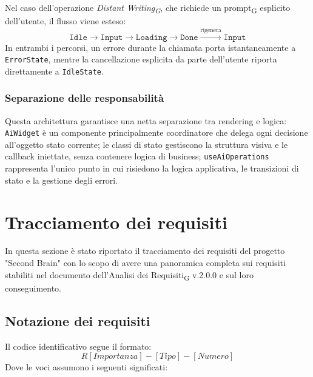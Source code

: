 \documentclass[11pt,a4paper]{article}
\newcommand{\gls}[1]{#1\textsubscript{G}}
\begin{document}
Nel caso dell'operazione \textit{\gls{Distant Writing}}, che richiede un \gls{prompt} esplicito dell'utente, il flusso viene esteso:
\begin{equation*}
\texttt{Idle} \to \texttt{Input} \to \texttt{Loading} \to \texttt{Done} \xrightarrow{\text{rigenera}} \texttt{Input}
\end{equation*}
In entrambi i percorsi, un errore durante la chiamata porta istantaneamente a \texttt{ErrorState}, mentre la cancellazione esplicita da parte dell'utente riporta direttamente a \texttt{IdleState}.

\subsubsection{Separazione delle responsabilità}
Questa architettura garantisce una netta separazione tra rendering e logica: \texttt{AiWidget} è un componente principalmente coordinatore che delega ogni decisione all’oggetto stato corrente; le classi di stato gestiscono la struttura visiva e le callback iniettate, senza contenere logica di business; \texttt{useAiOperations} rappresenta l’unico punto in cui risiedono la logica applicativa, le transizioni di stato e la gestione degli errori.


\newpage

\section{Tracciamento dei requisiti}
In questa sezione è stato riportato il tracciamento dei requisiti del progetto "Second Brain" con lo scopo di avere una panoramica completa sui requisiti stabiliti nel documento dell'\gls{Analisi dei Requisiti} v.2.0.0 e sul loro conseguimento.

\subsection{Notazione dei requisiti}
Il codice identificativo segue il formato:
\[
R[Importanza]-[Tipo]-[Numero]
\]
Dove le voci assumono i seguenti significati:
\end{document}
